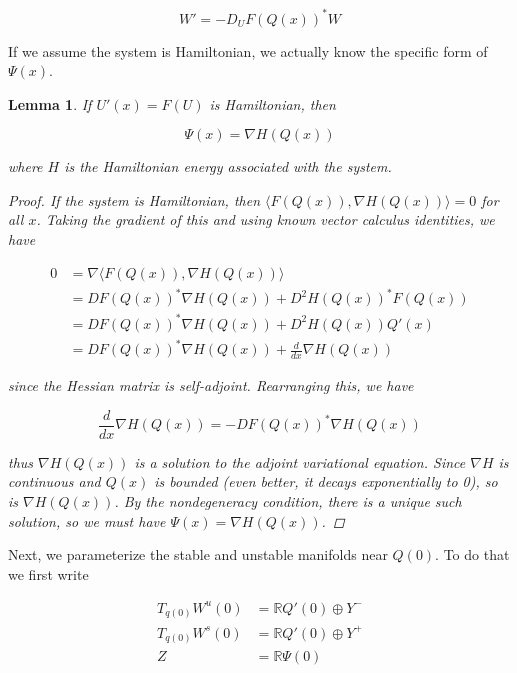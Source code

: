 \documentclass[12pt]{article}
\def\R{{\mathbb R}}
\newtheorem{lemma}{Lemma}
\begin{document}
\begin{equation}
W' = -D_U F(Q(x))^* W
\end{equation}

If we assume the system is Hamiltonian, we actually know the specific form of $\Psi(x)$.


\begin{lemma}

If $U'(x) = F(U)$ is Hamiltonian, then

\begin{equation}
\Psi(x) = \nabla H(Q(x))
\end{equation}

where $H$ is the Hamiltonian energy associated with the system.

\begin{proof}

If the system is Hamiltonian, then $\langle F(Q(x)), \nabla H(Q(x)) \rangle = 0$ for all $x$. Taking the gradient of this and using known vector calculus identities, we have

\begin{align*}
0 &= \nabla \langle F(Q(x)), \nabla H(Q(x)) \rangle \\
&= D F(Q(x))^* \nabla H(Q(x)) + D^2 H(Q(x))^* F(Q(x)) \\
&= D F(Q(x))^* \nabla H(Q(x)) + D^2 H(Q(x)) Q'(x) \\
&= D F(Q(x))^* \nabla H(Q(x)) + \frac{d}{dx} \nabla H(Q(x))
\end{align*}

since the Hessian matrix is self-adjoint. Rearranging this, we have

\begin{equation}
\frac{d}{dx} \nabla H(Q(x)) = -D F(Q(x))^* \nabla H(Q(x)) 
\end{equation}

thus $\nabla H(Q(x))$ is a solution to the adjoint variational equation. Since $\nabla H$ is continuous and $Q(x)$ is bounded (even better, it decays exponentially to 0), so is $\nabla H(Q(x))$. By the nondegeneracy condition, there is a unique such solution, so we must have $\Psi(x) = \nabla H(Q(x))$.

\end{proof}
\end{lemma}

Next, we parameterize the stable and unstable manifolds near $Q(0)$. To do that we first write

\begin{align*}
T_{q(0)}W^u(0) &= \R Q'(0) \oplus Y^- \\
T_{q(0)}W^s(0) &= \R Q'(0) \oplus Y^+ \\
Z &= \R \Psi(0)
\end{align*}
\end{document}

